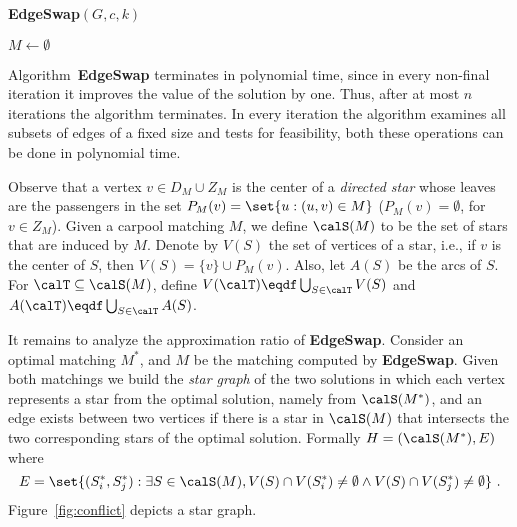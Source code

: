 \begin{algorithm}
\caption{\textbf{EdgeSwap}$(G,c,k)$}
\label{alg:local}
$M \leftarrow \emptyset$								\\
\end{algorithm}

Algorithm~\textbf{EdgeSwap} terminates in polynomial time, since in
every non-final iteration it improves the value of the solution by
one.  Thus, after at most $n$ iterations the algorithm terminates.  In
every iteration the algorithm examines all subsets of edges of a fixed
size and tests for feasibility, both these operations can be done in
polynomial time.

Observe that a vertex $v \in D_M \cup Z_M$ is the center of
a \emph{directed star} whose leaves are the passengers in the set
$P_M(v) = \set{u : (u,v) \in M}$
($P_M(v) = \emptyset$, for $v \in Z_M$).
%
Given a carpool matching $M$, we define $\calS(M)$ to be the set of
stars that are induced by $M$.  Denote by $V(S)$ the set of vertices
of a star, i.e., if $v$ is the center of $S$, then $V(S) = \{v\} \cup
P_M(v)$.  Also, let $A(S)$ be the arcs of $S$.  For
$\calT \subseteq \calS(M)$, define
$V(\calT) \eqdf \bigcup_{S \in \calT} V(S)$ and
$A(\calT) \eqdf \bigcup_{S \in \calT} A(S)$.

It remains to analyze the approximation ratio of \textbf{EdgeSwap}.
Consider an optimal matching $M^*$, and $M$ be the matching computed
by \textbf{EdgeSwap}.  Given both matchings we build the \emph{star
  graph} of the two solutions in which each vertex represents a star
from the optimal solution, namely from $\calS(M^*)$, and an edge
exists between two vertices if there is a star in $\calS(M)$ that
intersects the two corresponding stars of the optimal solution.
%
Formally $H = (\calS(M^*), E)$ where
\[
E = \set{(S^*_i, S^*_j) : \exists S \in \calS(M), 
         V(S) \cap V(S^*_i) \neq \emptyset \land
         V(S) \cap V(S^*_j) \neq \emptyset}
~.
\]
Figure~\ref{fig:conflict} depicts a star graph.

